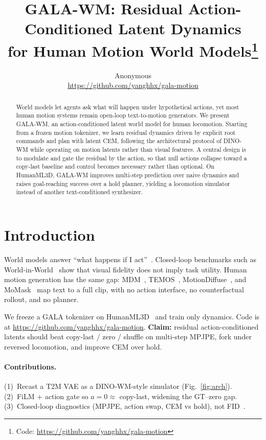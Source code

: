 \documentclass[10pt,twocolumn]{article}
\title{\vspace{-0.6em}GALA-WM: Residual Action-Conditioned Latent Dynamics\\for Human Motion World Models\thanks{Code: \url{https://github.com/yanghhx/gala-motion}}}
\author{Anonymous\\
\small \url{https://github.com/yanghhx/gala-motion}}
\date{}
\begin{document}
\maketitle
\vspace{-1.0em}

\begin{abstract}
World models let agents ask what will happen under hypothetical actions, yet most human motion systems remain open-loop text-to-motion generators.
We present GALA-WM, an action-conditioned latent world model for human locomotion.
Starting from a frozen motion tokenizer, we learn residual dynamics driven by explicit root commands and plan with latent CEM, following the architectural protocol of DINO-WM while operating on motion latents rather than visual features.
A central design is to modulate and gate the residual by the action, so that null actions collapse toward a copy-last baseline and control becomes necessary rather than optional.
On HumanML3D, GALA-WM improves multi-step prediction over naive dynamics and raises goal-reaching success over a hold planner, yielding a locomotion simulator instead of another text-conditioned synthesizer.
\end{abstract}

\section{Introduction}

World models answer ``what happens if I act''~\cite{ha2018world,hafner2025dreamerv3,lecun2022path}.
Closed-loop benchmarks such as World-in-World~\cite{zhang2026worldinworld} show that visual fidelity does not imply task utility.
Human motion generation has the same gap: MDM~\cite{tevet2023mdm}, TEMOS~\cite{petrovich2022temos}, MotionDiffuse~\cite{zhang2024motiondiffuse}, and MoMask~\cite{guo2024momask} map text to a full clip, with no action interface, no counterfactual rollout, and no planner.

We freeze a GALA tokenizer on HumanML3D~\cite{guo2022humanml3d} and train only dynamics.
Code is at \url{https://github.com/yanghhx/gala-motion}.
\textbf{Claim:} residual action-conditioned latents should beat copy-last / zero / shuffle on multi-step MPJPE, fork under reversed locomotion, and improve CEM over hold.

\paragraph{Contributions.}
(1)~Recast a T2M VAE as a DINO-WM-style simulator (Fig.~\ref{fig:arch}).
(2)~FiLM + action gate so $a{=}0\approx$ copy-last, widening the GT--zero gap.
(3)~Closed-loop diagnostics (MPJPE, action swap, CEM vs hold), not FID~\cite{ebert2018visual,hafner2019planet,zhou2024dinowm}.
\end{document}
